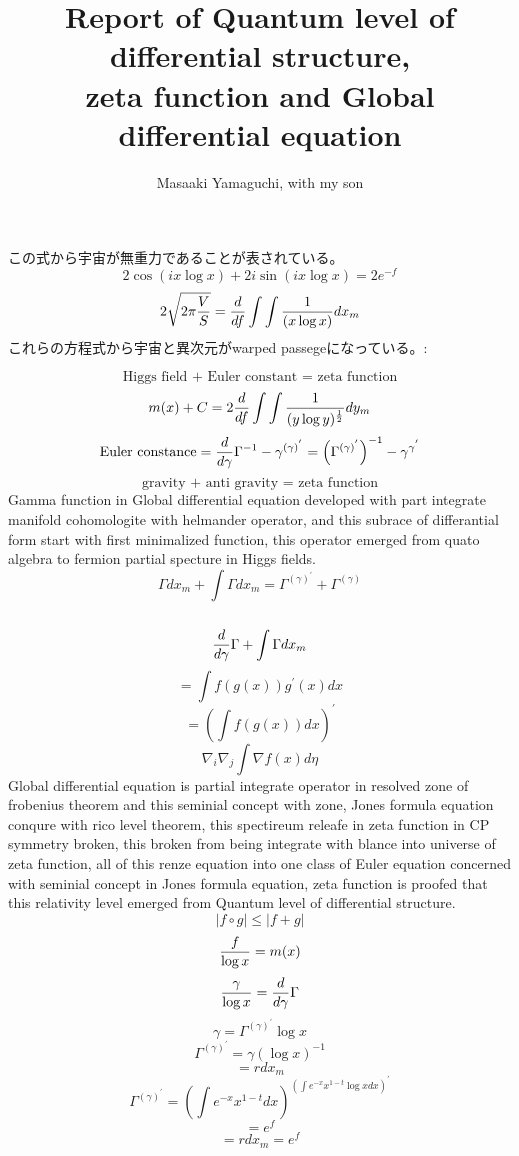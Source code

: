 \documentclass{jsarticle}
\begin{document}
  この式から宇宙が無重力であることが表されている。
  $$ 2 \cos (i x \log x) + 2 i \sin(i x \log x) = 2 e^{-f} $$
  $$ 2 \sqrt{2 \pi {V \over S}} = {d \over df} 
  \int \int{1 \over (x \log x)}dx_m$$
  これらの方程式から宇宙と異次元がwarped passegeになっている。:

\newpage
\title{Report of Quantum level of differential structure, \\
zeta function and Global differential equation}
\author{Masaaki Yamaguchi, with my son}

  $$ \text{Higgs field + Euler constant = zeta function} $$
  $$ m(x) + C = 2 {d \over df}\int\int {1 \over (y \log y)^{1 \over 2}}dy_m$$
  $$ \text{Euler constance} = {d \over d \gamma}\Gamma^{-1} - \gamma^{(\gamma)
  ^{'}} = {\left(\Gamma^{(\gamma)^{'}}\right)}^{-1} - \gamma^{\gamma^{'}} $$
  $$ \text{gravity + anti gravity = zeta function} $$
  Gamma function in Global differential equation developed with part integrate
  manifold cohomologite with helmander operator, and this subrace of 
  differantial form start with first minimalized function, this operator
  emerged from quato algebra to fermion partial specture in Higgs fields.
  $$ \Gamma dx_m + \int \Gamma dx_m = \Gamma^{(\gamma)^{'}} + \Gamma^{(
  \gamma)} $$　
  $$ {d \over d \gamma}\Gamma + \int \Gamma dx_m $$
  $$ = \int f(g(x))g^{'}(x)dx $$
  $$ = \left(\int f(g(x))dx\right)^{'} $$
  $$ \nabla_i \nabla_j \int \nabla f(x) d \eta $$
  Global differential equation is partial integrate operator in resolved
  zone of frobenius theorem and this seminial concept with zone,
  Jones formula equation conqure with rico level theorem,
  this spectireum releafe in zeta function in CP symmetry broken,
  this broken from being integrate with blance into universe of zeta function,
  all of this renze equation into one class of Euler equation concerned with
  seminial concept in Jones formula equation, 
  zeta function is proofed that this relativity level 
  emerged from Quantum level of differential structure.
    $$ |f \circ g| \le |f + g| $$
  $$ {f \over \log x} = m(x) $$
  $$ {\gamma \over \log x} = {d \over d \gamma}\Gamma $$
  $$ \gamma = \Gamma^{(\gamma)^{'}}\log x$$
  $$ \Gamma^{(\gamma)^{'}} = \gamma (\log x)^{-1} $$
  $$ = r dx_m $$
  $$ \Gamma^{(\gamma)^{'}} = \left(\int e^{-x}x^{1 - t}dx\right)^{
	  \left(\int e^{-x}x^{1 - t} \log x dx\right)^{'}} $$
  $$ = e^{f} $$
  $$ = r dx_m = e^{f} $$
 
\end{document}
